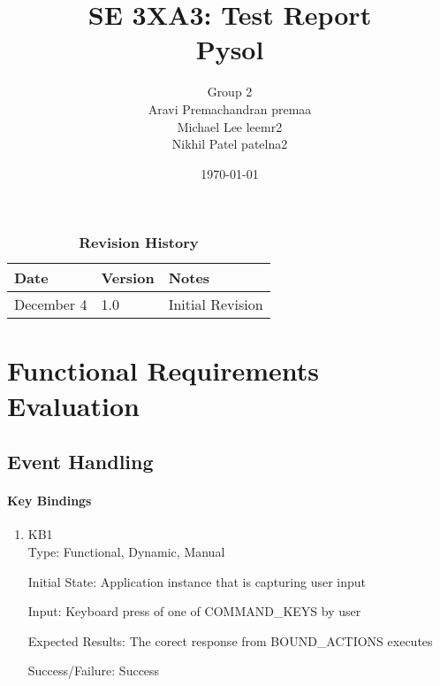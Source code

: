 \documentclass[12pt, titlepage]{article}
\title{SE 3XA3: Test Report\\Pysol}
\author{Group 2
		\\ Aravi Premachandran premaa
		\\ Michael Lee  leemr2
		\\ Nikhil Patel  patelna2
}
\date{\today}
\begin{document}
\maketitle

\tableofcontents
\listoftables
\listoffigures

\begin{table}[bp]
\caption{\bf Revision History}
\begin{tabularx}{\textwidth}{p{3cm}p{2cm}X}
\toprule {\bf Date} & {\bf Version} & {\bf Notes}\\
\midrule
December 4 & 1.0 & Initial Revision\\
\bottomrule
\end{tabularx}
\end{table}

\newpage



\section{Functional Requirements Evaluation}

	\subsection{Event Handling}
	
	\paragraph{Key Bindings}
	\begin{enumerate}
		\item{KB1\\}
		Type: Functional, Dynamic, Manual
		
		Initial State: Application instance that is capturing user input
		
		Input: Keyboard press of one of COMMAND\_KEYS by user
		
		Expected Results: The corect response from BOUND_ACTIONS executes 

		Success/Failure: Success
		
	\end{enumerate}
\end{document}
